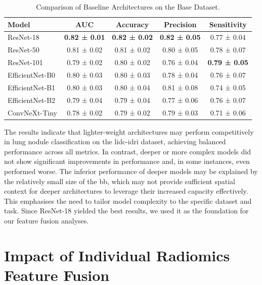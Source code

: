\begin{table}[ht]
    \centering
    \caption{Comparison of Baseline Architectures on the Base Dataset.}
    \label{tab:baseline_comparison}
    \begin{tabular}{lcccc}
        \toprule
        \textbf{Model} & \textbf{AUC} & \textbf{Accuracy} & \textbf{Precision} & \textbf{Sensitivity} \\
        \midrule
        ResNet-18         & \textbf{0.82 ± 0.01} & \textbf{0.82 ± 0.02} & \textbf{0.82 ± 0.05} & 0.77 ± 0.04 \\
        ResNet-50         & 0.81 ± 0.02 & 0.81 ± 0.02 & 0.80 ± 0.05 & 0.78 ± 0.07 \\
        ResNet-101        & 0.79 ± 0.02 & 0.80 ± 0.02 & 0.76 ± 0.04 & \textbf{0.79 ± 0.05} \\ \hline \addlinespace
        EfficientNet-B0   & 0.80 ± 0.03 & 0.80 ± 0.03 & 0.78 ± 0.04 & 0.76 ± 0.07 \\
        EfficientNet-B1   & 0.80 ± 0.03 & 0.80 ± 0.04 & 0.81 ± 0.08 & 0.74 ± 0.05 \\
        EfficientNet-B2   & 0.79 ± 0.04 & 0.79 ± 0.04 & 0.77 ± 0.06 & 0.76 ± 0.07 \\ \hline \addlinespace
        ConvNeXt-Tiny     & 0.78 ± 0.02 & 0.79 ± 0.02 & 0.79 ± 0.03 & 0.71 ± 0.06 \\		
        \bottomrule
    \end{tabular}
\end{table}

The results indicate that lighter-weight architectures may perform competitively in lung nodule classification on the \ac{lidc-idri} dataset, achieving balanced performance across all metrics. In contrast, deeper or more complex models did not show significant improvements in performance and, in some instances, even performed worse. The inferior performance of deeper models may be explained by the relatively small size of the \ac{bb}, which may not provide sufficient spatial context for deeper architectures to leverage their increased capacity effectively. This emphasises the need to tailor model complexity to the specific dataset and task. Since ResNet-18 yielded the best results, we used it as the foundation for our feature fusion analyses.

\FloatBarrier

\section{Impact of Individual Radiomics Feature Fusion}


